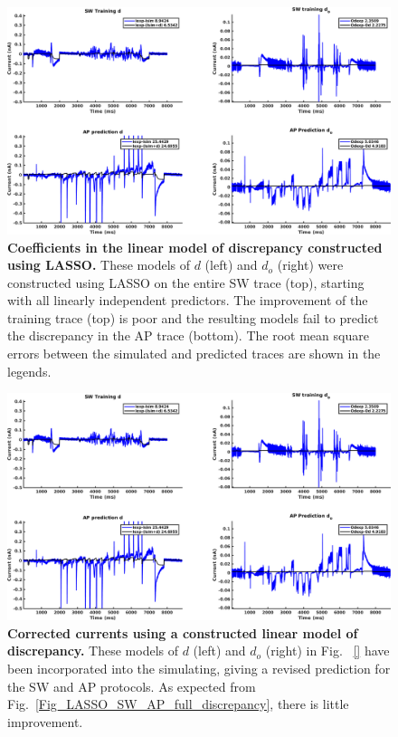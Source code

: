 \documentclass[11pt,a4paper,oneside]{article}
\begin{document}
\begin{figure}[t]
\begin{center}
\includegraphics[scale=0.42]{Figures/LASSO_SW_AP_full_discrepancy.png}
\caption{\textbf{Coefficients in the linear model of discrepancy constructed using LASSO.} These models of $d$ (left) and $d_o$ (right) were constructed using LASSO on the entire SW trace (top), starting with all linearly independent predictors. The improvement of the training trace (top) is poor and the resulting models fail to predict the discrepancy in the AP trace (bottom). The root mean square errors between the simulated and predicted traces are shown in the legends. } 
\label{Fig_LASSO_SW_AP_coefficients}
\end{center}
\end{figure}

\begin{figure}[hbt]
\begin{center}
\includegraphics[scale=0.42]{Figures/LASSO_SW_AP_full_discrepancy.png}
\caption{\textbf{Corrected currents using a constructed linear model of discrepancy.} These models of $d$ (left) and $d_o$ (right) in Fig. ~\ref{} have been incorporated into the simulating, giving a revised prediction for the SW and AP protocols. As expected from Fig.~\ref{Fig_LASSO_SW_AP_full_discrepancy}, there is little improvement.}
\label{Fig_LASSO_SW_AP_lambda}
\end{center}
\end{figure}
\end{document}
